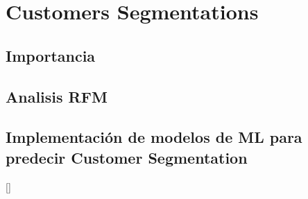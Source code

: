 

\chapter{Customers Segmentations}

\section{Importancia}
\section{Analisis RFM}
\section{Implementación de modelos de ML para predecir Customer Segmentation}
[\citep{latex}]
